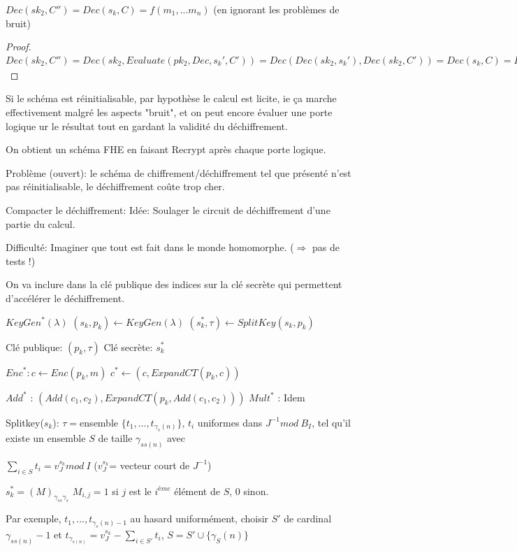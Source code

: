 \begin{proposition}
$Dec(sk_2,C'')=Dec(s_k,C)=f(m_1,...m_n)$ (en ignorant les problèmes de bruit)
\end{proposition}

\begin{proof}
$Dec(sk_2,C'')=Dec(sk_2,Evaluate(pk_2,Dec,s_k',C'))=Dec(Dec(sk_2,s_k'),Dec(sk_2,C'))=Dec(s_k,C)=Dec(s_k,Evaluate(p_k,f,c_1,...,c_n))=f(m_1,...,m_n)$
\end{proof}

Si le schéma est réinitialisable, par hypothèse le calcul est licite, ie ça marche effectivement malgré les aspects "bruit", et on peut encore évaluer une porte logique ur le résultat tout en gardant la validité du déchiffrement.

On obtient un schéma FHE en faisant Recrypt après chaque porte logique.

Problème (ouvert): le schéma de chiffrement/déchiffrement tel que présenté n'est pas réinitialisable, le déchiffrement coûte trop cher.

Compacter le déchiffrement: Idée: Soulager le circuit de déchiffrement d'une partie du calcul.

Difficulté: Imaginer que tout est fait dans le monde homomorphe. ($\Rightarrow$ pas de tests !)

On va inclure dans la clé publique des indices sur la clé secrète qui permettent d'accélérer le déchiffrement.

$KeyGen^*(\lambda)$
$(s_k,p_k) \leftarrow KeyGen(\lambda)$
$(s_k^*,\tau) \leftarrow SplitKey(s_k,p_k)$

Clé publique: $(p_k,\tau)$
Clé secrète: $s_k^*$

$Enc^*: c \leftarrow Enc(p_k,m)$
$c^* \leftarrow (c,Expand CT(p_k,c))$

$Add^*$ : $(Add(c_1,c_2),Expand CT(p_k, Add(c_1,c_2)))$
$Mult^*$ : Idem

Splitkey($s_k$):
$\tau=$ensemble $\{ t_1,...,t_{\gamma_s(n)} \}$, $t_i$ uniformes dans $J^{-1} mod \ B_I$, tel qu'il existe un ensemble $S$ de taille $\gamma_{ss(n)}$ avec

$\sum_{i \in S} t_i= v_J^{s_k} mod \ I$ ($v_J^{s_k}$= vecteur court de $J^{-1}$)

$s_k^*=(M)_{\gamma_{ss} \gamma_s}$ $M_{i,j}=1$ si $j$ est le $i^{ème}$ élément de $S$, $0$ sinon. 

Par exemple, $t_1,...,t_{\gamma_s(n)-1}$ au hasard uniformément, choisir $S'$ de cardinal $\gamma_{ss(n)}-1$ et
$t_{\gamma_{s(n)}}=v_J^{s_k} - \sum_{i \in S'} t_i$, $S=S' \cup \{ \gamma_S(n) \}$

